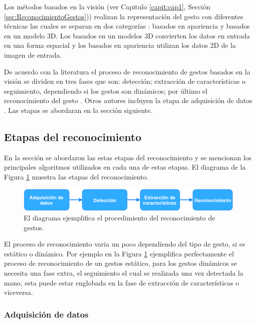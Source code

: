 Los métodos basados en la visión (ver Capitulo \ref{capit:cap1}, Sección \ref{sec:ReconocimientoGestos})) realizan la representación del gesto con diferentes técnicas las cuales se separan en dos categorías \citep{Rautaray2012}: basados en apariencia y basados en un modelo 3D. Los basados en un modelos 3D convierten los datos en entrada en una forma espacial y los basados en apariencia utilizan los datos 2D de la imagen de entrada.      

De acuerdo con la literatura el proceso de reconocimiento de gestos basados en la visión se dividen en tres fases que son: detección; extracción de características o seguimiento, dependiendo si los gestos son dinámicos; por último el reconocimiento del gesto \citep{Rautaray2012}. Otros autores incluyen la etapa de adquisición de datos \citep{Hasan2012} . Las etapas se abordaran en la sección siguiente. 


\subsection{Etapas del reconocimiento}\label{subsec:EtapasReconocimiento}  
En la sección se abordaron las estas etapas del reconocimiento y se mencionan los principales algoritmos utilizados en cada una de estas etapas. El diagrama de la Figura \ref{fig:HGR} muestra las etapas del reconocimiento.  

\begin{figure}[h!]
\begin{center}
\includegraphics[scale=.6]{./Figures/HGR.png}
\end{center}
\caption{El diagrama ejemplifica el procedimiento del reconocimiento de gestos.}
\label{fig:HGR}
\end{figure}

El proceso de reconocimiento varia un poco dependiendo del tipo de gesto, si es estático o dinámico. Por ejemplo en la Figura \ref{fig:HGR} ejemplifica perfectamente el proceso de reconocimiento de un gestos estático, para los gestos dinámicos se necesita una fase extra, el seguimiento el cual se realizada una vez detectada la mano, esta puede estar englobada en la fase de extracción de características o viceversa. 

\subsubsection{Adquisición de datos}\label{sssec:EtapaAdquisicion}

